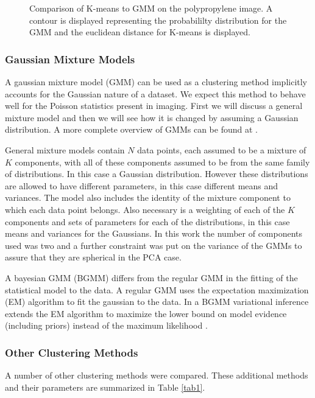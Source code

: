 \documentclass[a4paper,11pt]{article}
\begin{document}
\begin{figure}[t!]
    \caption{Comparison of K-means to GMM on the polypropylene image. A contour is displayed representing the probabililty distribution for the GMM and the euclidean distance for K-means is displayed.}
    \label{clustering_methods}
\end{figure}

\subsubsection{Gaussian Mixture Models}

A gaussian mixture model (GMM) can be used as a clustering method implicitly accounts for the Gaussian nature of a dataset. We expect this method to behave well for the Poisson statistics present in imaging. First we will discuss a general mixture model and then we will see how it is changed by assuming a Gaussian distribution. A more complete overview of GMMs can be found at \cite{DinovExpectationTutorial}.

General mixture models contain $N$ data points, each assumed to be a mixture of $K$ components, with all of these components assumed to be from the same family of distributions. In this case a Gaussian distribution. However these distributions are allowed to have different parameters, in this case different means and variances. The model also includes the identity of the mixture component to which each data point belongs. Also necessary is a weighting of each of the $K$ components and sets of parameters for each of the distributions, in this case means and variances for the Gaussians. In this work the number of components used was two and a further constraint was put on the variance of the GMMs to assure that they are spherical in the PCA case.

A bayesian GMM (BGMM) differs from the regular GMM in the fitting of the statistical model to the data. A regular GMM uses the expectation maximization (EM) algorithm to fit the gaussian to the data. In a BGMM variational inference extends the EM algorithm to maximize the lower bound on model evidence (including priors) instead of the maximum likelihood \cite{Blei2006VariationalMixtures}.

\subsubsection{Other Clustering Methods}

A number of other clustering methods were compared. These additional methods and their parameters are summarized in Table \ref{tab1}.
\end{document}
